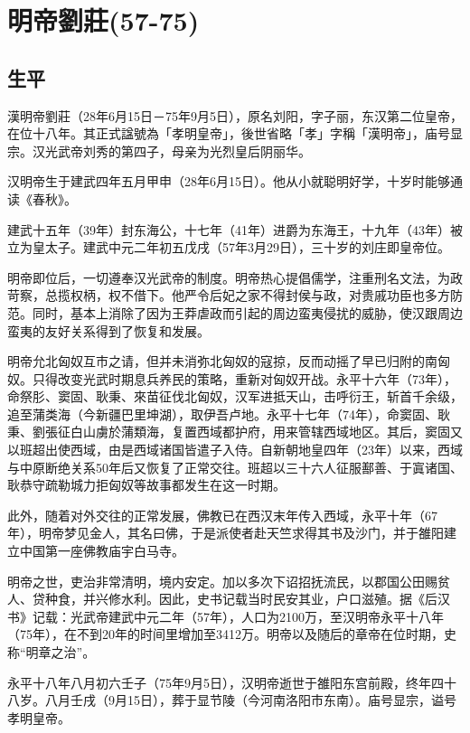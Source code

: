 
\section{明帝劉莊\tiny(57-75)}

\subsection{生平}

漢明帝劉莊（28年6月15日－75年9月5日），原名刘阳，字子丽，东汉第二位皇帝，在位十八年。其正式諡號為「孝明皇帝」，後世省略「孝」字稱「漢明帝」，庙号显宗。汉光武帝刘秀的第四子，母亲为光烈皇后阴丽华。

汉明帝生于建武四年五月甲申（28年6月15日）。他从小就聪明好学，十岁时能够通读《春秋》。

建武十五年（39年）封东海公，十七年（41年）进爵为东海王，十九年（43年）被立为皇太子。建武中元二年初五戊戌（57年3月29日），三十岁的刘庄即皇帝位。

明帝即位后，一切遵奉汉光武帝的制度。明帝热心提倡儒学，注重刑名文法，为政苛察，总揽权柄，权不借下。他严令后妃之家不得封侯与政，对贵戚功臣也多方防范。同时，基本上消除了因为王莽虐政而引起的周边蛮夷侵扰的威胁，使汉跟周边蛮夷的友好关系得到了恢复和发展。

明帝允北匈奴互市之请，但并未消弥北匈奴的寇掠，反而动摇了早已归附的南匈奴。只得改变光武时期息兵养民的策略，重新对匈奴开战。永平十六年（73年），命祭肜、窦固、耿秉、來苗征伐北匈奴，汉军进抵天山，击呼衍王，斩首千余级，追至蒲类海（今新疆巴里坤湖），取伊吾卢地。永平十七年（74年），命窦固、耿秉、劉張征白山虜於蒲類海，复置西域都护府，用来管辖西域地区。其后，窦固又以班超出使西域，由是西域诸国皆遣子入侍。自新朝地皇四年（23年）以来，西域与中原断绝关系50年后又恢复了正常交往。班超以三十六人征服鄯善、于寘诸国、耿恭守疏勒城力拒匈奴等故事都发生在这一时期。

此外，随着对外交往的正常发展，佛教已在西汉末年传入西域，永平十年（67年），明帝梦见金人，其名曰佛，于是派使者赴天竺求得其书及沙门，并于雒阳建立中国第一座佛教庙宇白马寺。

明帝之世，吏治非常清明，境内安定。加以多次下诏招抚流民，以郡国公田赐贫人、贷种食，并兴修水利。因此，史书记载当时民安其业，户口滋殖。据《后汉书》记载：光武帝建武中元二年（57年），人口为2100万，至汉明帝永平十八年（75年），在不到20年的时间里增加至3412万。明帝以及随后的章帝在位时期，史称“明章之治”。

永平十八年八月初六壬子（75年9月5日），汉明帝逝世于雒阳东宫前殿，终年四十八岁。八月壬戌（9月15日），葬于显节陵（今河南洛阳市东南）。庙号显宗，谥号孝明皇帝。

